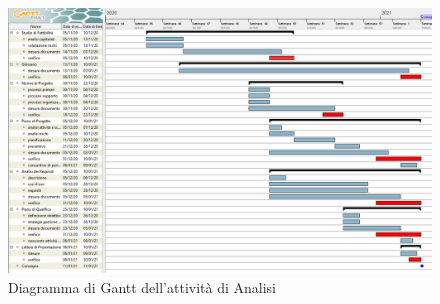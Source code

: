 \begin{landscape}

\begin{figure}[h]
	\centering
	\includegraphics[width=\linewidth]{Images/GanttPianificazioneAnalisi.PNG}
	\caption{Diagramma di Gantt dell'attività di Analisi}
\end{figure}

\end{landscape}



